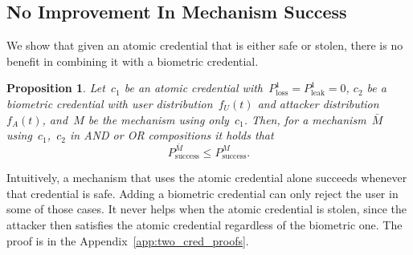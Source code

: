 \documentclass[conference,compsoc]{IEEEtran}
\newtheorem{proposition}{Proposition}
\begin{document}
\subsection{No Improvement In Mechanism Success}\label{sec:no_success_improvement}
\noindent
We show that given an atomic credential that is either safe or stolen, there is no benefit in combining it with a biometric credential.
\begin{proposition}\label{thm:no_improvement}
    Let~$c_1$ be an atomic credential with~${P^1_\text{loss} = P^1_\text{leak} = 0}$, $c_2$ be a biometric credential with user distribution~$f_U(t)$ and attacker distribution~$f_A(t)$, and~$M$ be the mechanism using only~$c_1$. Then, for a mechanism~$\bar{M}$ using~$c_1$,~$c_2$ in \emph{AND} or \emph{OR} compositions it holds that
    \begin{equation*}
        P_{\mathrm{success}}^{\bar{M}} \le P_{\mathrm{success}}^{M}.
    \end{equation*}
\end{proposition}
\noindent
Intuitively, a mechanism that uses the atomic credential alone succeeds whenever that credential is safe. 
Adding a biometric credential can only reject the user in some of those cases. 
It never helps when the atomic credential is stolen, since the attacker then satisfies the atomic credential regardless of the biometric one. 
The proof is in the Appendix~\ref{app:two_cred_proofs}.
\end{document}
